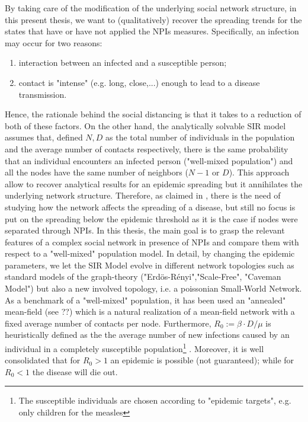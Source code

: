 \documentclass[a4paper,10pt,twoside]{book} %
\theoremstyle{definition}
\begin{document}
By taking care of the modification of the underlying social network structure, in this present thesis, we want to (qualitatively) recover the spreading trends for the states that have or have not applied the NPIs measures. \newline
Specifically, an infection may occur for two reasons:
\begin{enumerate}
    \item interaction between an infected and a susceptible person;
    \item contact is "intense" (e.g. long, close,...) enough to lead to a disease transmission.
\end{enumerate}
Hence, the rationale behind the social distancing is that it takes to a reduction of both of these factors.
On the other hand, the analytically solvable SIR model assumes that, defined $N, D$ as the total number of individuals in the population and the average number of contacts respectively, there is the same probability that an individual encounters an infected person ("well-mixed population") and all the nodes have the same number of neighbors ($N-1$ or $D$). This approach allow to recover analytical results for an epidemic spreading but it annihilates the underlying network structure. Therefore, as claimed in \cite{VespignaniSatorras2001Epidemic}, there is the need of studying how the network affects the spreading of a disease, but still no focus is put on the spreading below the epidemic threshold \cite{Thurner::NetBasedExpl} as it is the case if nodes were separated through NPIs. 
In this thesis, the main goal is to grasp the relevant features of a complex social network in presence of NPIs and compare them with respect to a "well-mixed" population model.
In detail, by changing the epidemic parameters, we let the SIR Model evolve in different network topologies such as standard models of the graph-theory ("Erdös-Rényi","Scale-Free", "Caveman Model") but also a new involved topology, i.e. a poissonian Small-World Network. As a benchmark of a "well-mixed" population, it has been used an "annealed" mean-field (see ??) which is a natural realization of a mean-field network with a fixed average number of contacts per node.
Furthermore, $R_0 := \beta \cdot D/\mu$ is heuristically defined as the the average number of new infections caused by an individual in a completely susceptible population\footnote{The susceptible individuals are chosen according to "epidemic targets", e.g. only children for the measles} \cite{Kiss::MathOfEpiOnNet}. Moreover, it is well consolidated that for $R_0 > 1$ an epidemic is possible (not guaranteed); while for $R_0 < 1$ the disease will die out. 
\end{document}
